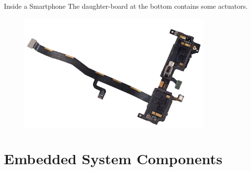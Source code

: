 \documentclass[aspectratio=169]{beamer}
\begin{document}
	\begin{frame}{Inside a Smartphone}
		The daughter-board at the bottom contains some actuators.
		\begin{figure}[b]
		\centering
		\includegraphics[width=\textwidth,height=6cm,keepaspectratio]{img/wdnGHA1UB3lBpZIL.png}
		\end{figure}
	\end{frame}    



\section{Embedded System Components}	
\end{document}
